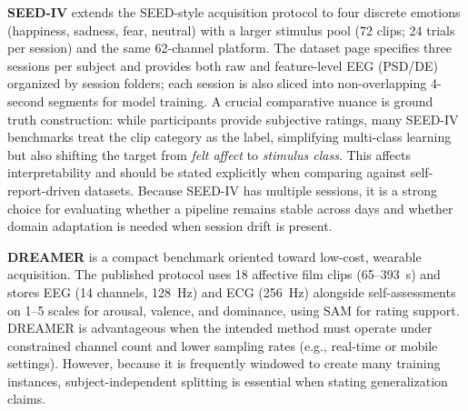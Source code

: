 \documentclass{WileyMSP-template}
\begin{document}
\textbf{SEED-IV}
 extends the SEED-style acquisition protocol to four discrete emotions (happiness, sadness, fear, neutral) with a larger stimulus pool (72 clips; 24 trials per session) and the same 62-channel platform. The dataset page specifies three sessions per subject and provides both raw and feature-level EEG (PSD/DE) organized by session folders; each session is also sliced into non-overlapping 4-second segments for model training. \cite{seediv_page}
A crucial comparative nuance is ground truth construction: while participants provide subjective ratings, many SEED-IV benchmarks treat the clip category as the label, simplifying multi-class learning but also shifting the target from \emph{felt affect} to \emph{stimulus class}. This affects interpretability and should be stated explicitly when comparing against self-report-driven datasets. \cite{kukhilava2025evaluation,seediv_page}
Because SEED-IV has multiple sessions, it is a strong choice for evaluating whether a pipeline remains stable across days and whether domain adaptation is needed when session drift is present. \cite{kukhilava2025evaluation}

\textbf{DREAMER}
 is a compact benchmark oriented toward low-cost, wearable acquisition. The published protocol uses 18 affective film clips (65--393~s) and stores EEG (14 channels, 128~Hz) and ECG (256~Hz) alongside self-assessments on 1--5 scales for arousal, valence, and dominance, using SAM for rating support. \cite{katsigiannis2018dreamer}
DREAMER is advantageous when the intended method must operate under constrained channel count and lower sampling rates (e.g., real-time or mobile settings). However, because it is frequently windowed to create many training instances, subject-independent splitting is essential when stating generalization claims. \cite{brookshire2024leakage,kukhilava2025evaluation}
\end{document}
